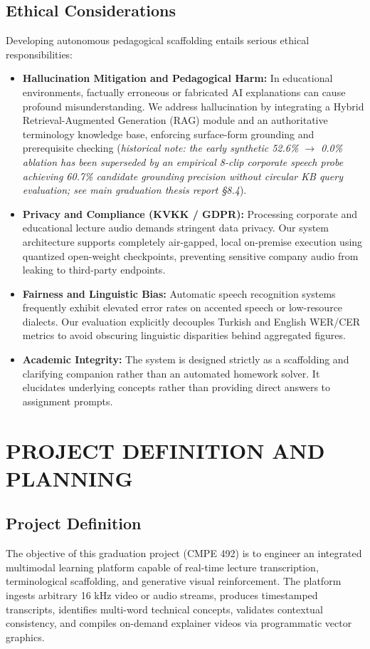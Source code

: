 \documentclass[a4paper,12pt]{report}
\begin{document}
\section{Ethical Considerations}
Developing autonomous pedagogical scaffolding entails serious ethical responsibilities:
\begin{itemize}
    \item \textbf{Hallucination Mitigation and Pedagogical Harm:} In educational environments, factually erroneous or fabricated AI explanations can cause profound misunderstanding. We address hallucination by integrating a Hybrid Retrieval-Augmented Generation (RAG) module and an authoritative terminology knowledge base, enforcing surface-form grounding and prerequisite checking (\emph{historical note: the early synthetic 52.6\% $\to$ 0.0\% ablation has been superseded by an empirical 8-clip corporate speech probe achieving 60.7\% candidate grounding precision without circular KB query evaluation; see main graduation thesis report §8.4}).
    \item \textbf{Privacy and Compliance (KVKK / GDPR):} Processing corporate and educational lecture audio demands stringent data privacy. Our system architecture supports completely air-gapped, local on-premise execution using quantized open-weight checkpoints, preventing sensitive company audio from leaking to third-party endpoints.
    \item \textbf{Fairness and Linguistic Bias:} Automatic speech recognition systems frequently exhibit elevated error rates on accented speech or low-resource dialects. Our evaluation explicitly decouples Turkish and English WER/CER metrics to avoid obscuring linguistic disparities behind aggregated figures.
    \item \textbf{Academic Integrity:} The system is designed strictly as a scaffolding and clarifying companion rather than an automated homework solver. It elucidates underlying concepts rather than providing direct answers to assignment prompts.
\end{itemize}


\chapter{PROJECT DEFINITION AND PLANNING}

\section{Project Definition}
The objective of this graduation project (CMPE 492) is to engineer an integrated multimodal learning platform capable of real-time lecture transcription, terminological scaffolding, and generative visual reinforcement. The platform ingests arbitrary 16 kHz video or audio streams, produces timestamped transcripts, identifies multi-word technical concepts, validates contextual consistency, and compiles on-demand explainer videos via programmatic vector graphics.
\end{document}
